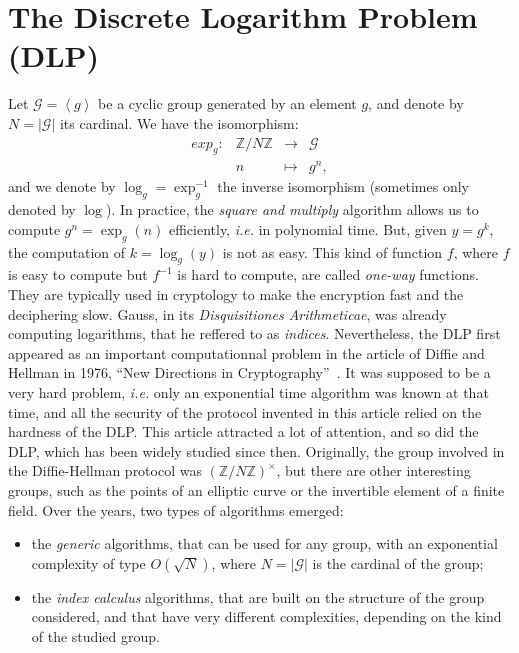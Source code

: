 \documentclass[a4paper,11pt]{article}
\theoremstyle{break}
\theoremstyle{sc}
\theoremstyle{definition}
\theoremstyle{remark}
\newcommand{\ie}{\emph{i.e. }}
\begin{document}
\section{The Discrete Logarithm Problem (DLP)}
Let $\mathcal G=\left\langle g\right\rangle$ be a cyclic group generated by an element
$g$, and denote by $N=|\mathcal G|$ its cardinal. We have the isomorphism:
\[
 \begin{array}{cccc}
   exp_g: & \mathbb{Z}/N\mathbb{Z} & \to & \mathcal G \\
   & n & \mapsto & g^n,
 \end{array}
\]
and we denote by $\log_g=\exp_g^{-1}$ the inverse isomorphism (sometimes only
denoted by $\log$). In practice, the
\emph{square and multiply} algorithm allows us to compute $g^n=\exp_g(n)$
efficiently, \ie in polynomial time. But, given $y = g^k$, the computation of $k
= \log_g(y)$ is not as easy. This kind of function $f$, where $f$ is easy to
compute but $f^{-1}$ is hard to compute, are called \emph{one-way} functions. They are
typically used in cryptology to make the encryption fast and the deciphering
slow. Gauss, in its \emph{Disquisitiones Arithmeticae}, was already computing
logarithms, that he reffered to as \emph{indices}. Nevertheless, the DLP first
appeared as an important computationnal problem in the article of Diffie and
Hellman in 1976, ``New Directions in Cryptography''~\cite{DH76}. It was supposed to be a very hard problem,
\ie only an exponential time algorithm was known at that time, and all the
security of the protocol invented in this article relied on the hardness of the
DLP. This article attracted a lot of attention, and so did the DLP, which has
been widely studied since then. Originally, the group involved in the Diffie-Hellman
protocol was $(\mathbb{Z}/N\mathbb{Z})^\times$, but there are other interesting
groups, such as the points of an elliptic curve or the invertible element of a
finite field. Over the years, two types of algorithms emerged:
\begin{itemize}
  \item the \emph{generic} algorithms, that can be used for any group, with an
    exponential complexity of type $O(\sqrt N)$, where $N=|\mathcal G|$ is the cardinal
    of the group;
  \item the \emph{index calculus} algorithms, that are built on the structure of
    the group considered, and that have very different complexities, depending
    on the kind of the studied group.
\end{itemize}
\end{document}
